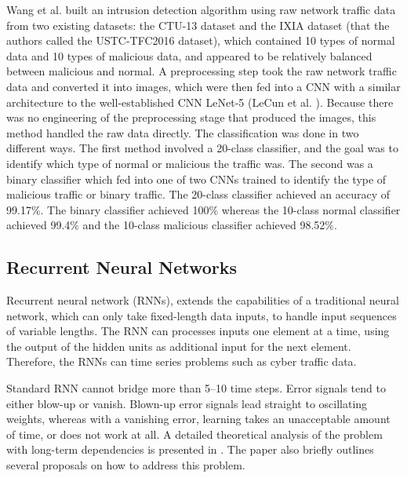 \documentclass[conference]{IEEEtran}
\begin{document}
Wang et al. \cite{wang2017malware} built an intrusion detection algorithm using raw network traffic data from two existing datasets: the CTU-13 dataset and the IXIA dataset (that the authors called the USTC-TFC2016 dataset), which contained 10 types of normal data and 10 types of malicious data, and appeared to be relatively balanced between malicious and normal. A preprocessing step took the raw network traffic data and converted it into images, which were then fed into a CNN with a similar architecture to the well-established CNN LeNet-5 (LeCun et al. \cite{lecun1995learning}). Because there was no engineering of the preprocessing stage that produced the images, this method handled the raw data directly. The classification was done in two different ways. The first method involved a 20-class classifier, and the goal was to identify which type of normal or malicious the traffic was. The second was a binary classifier which fed into one of two CNNs trained to identify the type of malicious traffic or binary traffic. The 20-class classifier achieved an accuracy of 99.17\%. The binary classifier achieved 100\% whereas the 10-class normal classifier achieved 99.4\% and the 10-class malicious classifier achieved 98.52\%.

\subsection{Recurrent Neural Networks}
Recurrent neural network  (RNNs), extends the capabilities of a traditional neural network, which can only take fixed-length data inputs, to handle input sequences of variable lengths. The RNN can processes inputs one element at a time, using the output of the hidden units as additional input for the next element. Therefore, the RNNs can time series problems such as cyber traffic data.

Standard RNN cannot bridge more than 5–10 time steps.   
Error  signals  tend  to  either  blow-up  or  vanish. 
Blown-up error signals lead straight to oscillating weights, whereas with a vanishing error, learning takes an  unacceptable  amount  of  time,  or  does  not  work at all.  
A detailed theoretical analysis of the problem with long-term dependencies is presented in \cite{hochreiter2001gradient}.  
The paper also briefly outlines several proposals on how to address this problem.
\end{document}
